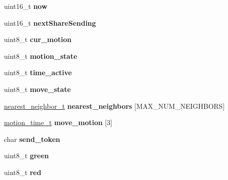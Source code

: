 \begin{DoxyCompactItemize}
uint16\+\_\+t {\bfseries now}
\item 
\mbox{\label{struct_u_s_e_r_d_a_t_a_a5153bf582ed6036c0bc0af91a507735b}} 
uint16\+\_\+t {\bfseries next\+Share\+Sending}
\item 
\mbox{\label{struct_u_s_e_r_d_a_t_a_a01bba9e445a0f16707267c0ce23fb9b0}} 
uint8\+\_\+t {\bfseries cur\+\_\+motion}
\item 
\mbox{\label{struct_u_s_e_r_d_a_t_a_a5cc036cf4f95c1f908b0253c67e6635d}} 
uint8\+\_\+t {\bfseries motion\+\_\+state}
\item 
\mbox{\label{struct_u_s_e_r_d_a_t_a_a517ee3480ceae26e41c5807b94d1b3f3}} 
uint8\+\_\+t {\bfseries time\+\_\+active}
\item 
\mbox{\label{struct_u_s_e_r_d_a_t_a_abf42309d619908c1318ec92fbd16cc6f}} 
uint8\+\_\+t {\bfseries move\+\_\+state}
\item 
\mbox{\label{struct_u_s_e_r_d_a_t_a_a7f78c5c44fd57c77fbc79f8f47913cac}} 
\mbox{\hyperlink{structnearest__neighbor__t}{nearest\+\_\+neighbor\+\_\+t}} {\bfseries nearest\+\_\+neighbors} \mbox{[}M\+A\+X\+\_\+\+N\+U\+M\+\_\+\+N\+E\+I\+G\+H\+B\+O\+RS\mbox{]}
\item 
\mbox{\label{struct_u_s_e_r_d_a_t_a_a3398ac63ab67360828efdd1bef369245}} 
\mbox{\hyperlink{structmotion__time__t}{motion\+\_\+time\+\_\+t}} {\bfseries move\+\_\+motion} \mbox{[}3\mbox{]}
\item 
\mbox{\label{struct_u_s_e_r_d_a_t_a_aef41574019eb64d4076ab8dfa1c0f8cb}} 
char {\bfseries send\+\_\+token}
\item 
\mbox{\label{struct_u_s_e_r_d_a_t_a_a90d21fa503b626c00cdc8d94863d5877}} 
uint8\+\_\+t {\bfseries green}
\item 
\mbox{\label{struct_u_s_e_r_d_a_t_a_ad47d918910aaa51c73160ac85999d09c}} 
uint8\+\_\+t {\bfseries red}
\item 
\mbox{\label{struct_u_s_e_r_d_a_t_a_a287b397e90d7b995c81ff54e741f96b2}} 

\end{DoxyCompactItemize}
